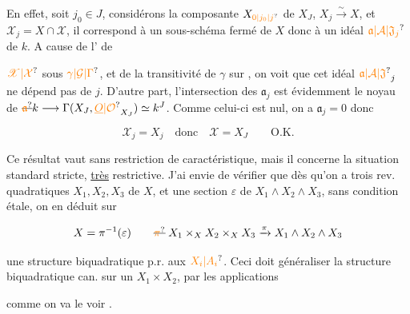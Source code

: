 En effet, soit $j_0\in J$, considérons la composante $X_{\unsure{0|j_0|j}}$ de $X_J$, $X_j\xrightarrow{\sim}X$, et $\mathscr X_j=X\cap\mathscr X$, il correspond à un sous-schéma fermé de $X$ donc à un idéal $\unsure{\mathfrak a|\mathcal A|\mathfrak J_j}$ de $k$. A cause de l' de


$\unsure{\mathscr X|\mathcal X}$ sous $\unsure{\gamma|\mathcal G|\Gamma}$, et de la transitivité de $\gamma$ sur , on voit que cet idéal $\unsure{\mathfrak a|\mathcal A|\mathfrak J}_j$ ne dépend pas de $j$. D'autre part, l'intersection des $\mathfrak a_j$ est évidemment le noyau de $\deleted{\unsure{\mathfrak a}}k\longrightarrow\Gamma(X_J,\unsure{\underline O|\mathcal O}_{X_J})\simeq k^J$. Comme celui-ci est nul, on a $\mathfrak a_j=0$ donc

\[
 \mathscr X_j=X_j\quad\text{donc}\quad\mathscr X=X_J\qquad\text{O.K.}
\]

Ce résultat vaut sans restriction de caractéristique, mais il concerne la situation standard stricte, \uline{très} restrictive. J'ai envie de vérifier que dès qu'on a trois rev. quadratiques $X_1,X_2,X_3$ de $X$, et une section $\varepsilon$ de $X_1\wedge X_2\wedge X_3$, sans condition étale, on en déduit sur

\[
 X=\pi^{-1}(\varepsilon)\qquad
 \deleted{\unsure{\pi}}\; X_1\times_X X_2\times_X X_3\xrightarrow{\pi}X_1\wedge X_2\wedge X_3
\]

une structure biquadratique p.r. aux $\unsure{X_i|A_i}$. Ceci doit généraliser la structure biquadratique can. sur un $X_1\times X_2$, par les applications


comme on va le voir .


